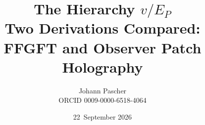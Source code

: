 \documentclass[11pt,a4paper]{report}
\title{The Hierarchy $v/E_P$\\[0.5em]\large Two Derivations Compared: FFGFT and Observer Patch Holography}
\date{22~September 2026}
\author{Johann Pascher\\\small ORCID 0009-0000-6518-4064}
\begin{document}
\renewcommand{\thechapter}{}
\renewcommand{\thesection}{\arabic{section}}
\maketitle
\tableofcontents

\end{document}
